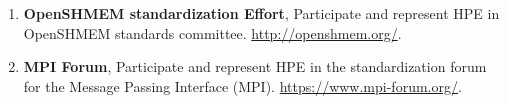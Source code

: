 \begin{enumerate}
\setcounter{enumi}{0}
\item \textbf{OpenSHMEM standardization Effort}, Participate and represent HPE
in OpenSHMEM standards committee. \url{http://openshmem.org/}.
\item \textbf{MPI Forum}, Participate and represent HPE in the standardization
forum for the Message Passing Interface (MPI). \url{https://www.mpi-forum.org/}.
\end{enumerate}

